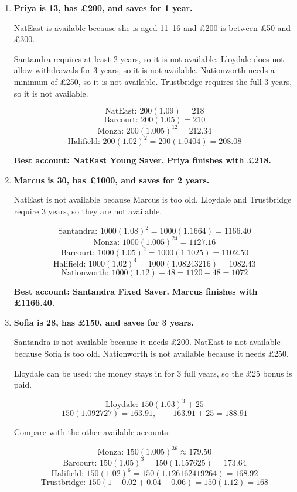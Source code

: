 \documentclass[12pt]{article}
\begin{document}
\begin{enumerate}[label=\textbf{\arabic*.}, leftmargin=4mm, itemsep=6mm, topsep=2mm]

\item \textbf{Priya is 13, has \pounds200, and saves for 1 year.}

NatEast is available because she is aged 11--16 and \pounds200 is between \pounds50 and \pounds300.

Santandra requires at least 2 years, so it is not available.  
Lloydale does not allow withdrawals for 3 years, so it is not available.  
Nationworth needs a minimum of \pounds250, so it is not available.  
Trustbridge requires the full 3 years, so it is not available.

\[
\text{NatEast: } 200(1.09)=218
\]
\[
\text{Barcourt: } 200(1.05)=210
\]
\[
\text{Monza: } 200(1.005)^{12}=212.34
\]
\[
\text{Halifield: } 200(1.02)^2=200(1.0404)=208.08
\]

\textbf{Best account: NatEast Young Saver.}  
\textbf{Priya finishes with \pounds218.}

\item \textbf{Marcus is 30, has \pounds1000, and saves for 2 years.}

NatEast is not available because Marcus is too old.  
Lloydale and Trustbridge require 3 years, so they are not available.

\[
\text{Santandra: } 1000(1.08)^2=1000(1.1664)=1166.40
\]
\[
\text{Monza: } 1000(1.005)^{24}=1127.16
\]
\[
\text{Barcourt: } 1000(1.05)^2=1000(1.1025)=1102.50
\]
\[
\text{Halifield: } 1000(1.02)^4=1000(1.08243216)=1082.43
\]
\[
\text{Nationworth: } 1000(1.12)-48=1120-48=1072
\]

\textbf{Best account: Santandra Fixed Saver.}  
\textbf{Marcus finishes with \pounds1166.40.}

\item \textbf{Sofia is 28, has \pounds150, and saves for 3 years.}

Santandra is not available because it needs \pounds200.  
NatEast is not available because Sofia is too old.  
Nationworth is not available because it needs \pounds250.  

Lloydale can be used: the money stays in for 3 full years, so the \pounds25 bonus is paid.

\[
\text{Lloydale: } 150(1.03)^3+25
\]
\[
150(1.092727)=163.91,\qquad 163.91+25=188.91
\]

Compare with the other available accounts:

\[
\text{Monza: } 150(1.005)^{36}\approx 179.50
\]
\[
\text{Barcourt: } 150(1.05)^3=150(1.157625)=173.64
\]
\[
\text{Halifield: } 150(1.02)^6=150(1.126162419264)=168.92
\]
\[
\text{Trustbridge: } 150(1+0.02+0.04+0.06)=150(1.12)=168
\]


\end{enumerate}
\end{document}
